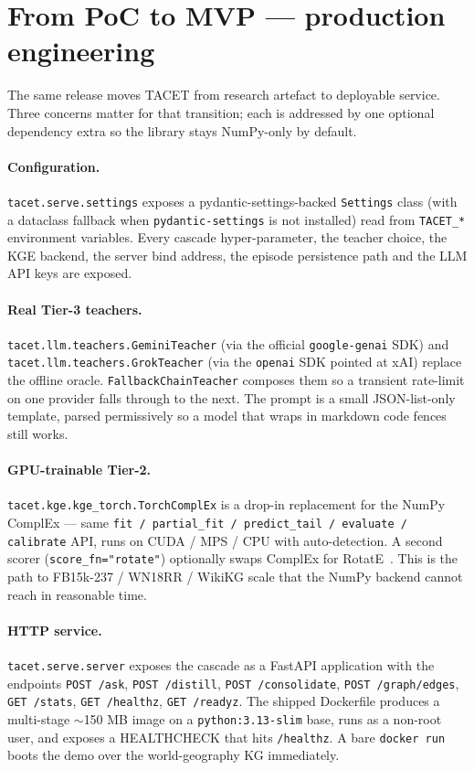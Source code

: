 \documentclass[11pt]{article}
\theoremstyle{plain}
\begin{document}
\section{From PoC to MVP --- production engineering}
\label{sec:mvp}

The same release moves TACET from research artefact to deployable
service. Three concerns matter for that transition; each is addressed by
one optional dependency extra so the library stays NumPy-only by default.

\paragraph{Configuration.}
\texttt{tacet.serve.settings} exposes a pydantic-settings-backed
\texttt{Settings} class (with a dataclass fallback when
\texttt{pydantic-settings} is not installed) read from
\texttt{TACET\_*} environment variables.
Every cascade hyper-parameter, the teacher choice, the KGE backend, the
server bind address, the episode persistence path and the LLM API keys
are exposed.

\paragraph{Real Tier-3 teachers.}
\texttt{tacet.llm.teachers.GeminiTeacher} (via the official
\texttt{google-genai} SDK) and \texttt{tacet.llm.teachers.GrokTeacher} (via
the \texttt{openai} SDK pointed at xAI) replace the offline oracle.
\texttt{FallbackChainTeacher} composes them so a transient rate-limit on
one provider falls through to the next. The
prompt is a small JSON-list-only template, parsed permissively so a model
that wraps in markdown code fences still works.

\paragraph{GPU-trainable Tier-2.}
\texttt{tacet.kge.kge\_torch.TorchComplEx} is a drop-in replacement for the
NumPy ComplEx --- same \texttt{fit / partial\_fit / predict\_tail / evaluate
/ calibrate} API, runs on CUDA / MPS / CPU with auto-detection. A second
scorer (\texttt{score\_fn="rotate"}) optionally swaps ComplEx for
RotatE~\citep{sun2019rotate}. This is the path to FB15k-237 / WN18RR /
WikiKG scale that the NumPy backend cannot reach in reasonable time.

\paragraph{HTTP service.}
\texttt{tacet.serve.server} exposes the cascade as a FastAPI application with
the endpoints \texttt{POST /ask}, \texttt{POST /distill},
\texttt{POST /consolidate}, \texttt{POST /graph/edges},
\texttt{GET /stats}, \texttt{GET /healthz}, \texttt{GET /readyz}. The
shipped Dockerfile produces a multi-stage \(\sim\)150 MB image on a
\texttt{python:3.13-slim} base, runs as a non-root user, and exposes a
HEALTHCHECK that hits \texttt{/healthz}. A bare \texttt{docker run} boots
the demo over the world-geography KG immediately.
\end{document}
